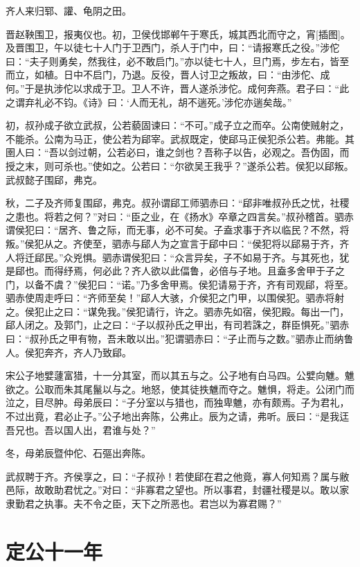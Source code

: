 \documentclass[a4paper,12pt,UTF8,twoside]{ctexbook}
\begin{document}
齐人来归郓、讙、龟阴之田。

晋赵鞅围卫，报夷仪也。初，卫侯伐邯郸午于寒氏，城其西北而守之，宵[插图]。及晋围卫，午以徒七十人门于卫西门，杀人于门中，曰：“请报寒氏之役。”涉佗曰：“夫子则勇矣，然我往，必不敢启门。”亦以徒七十人，旦门焉，步左右，皆至而立，如植。日中不启门，乃退。反役，晋人讨卫之叛故，曰：“由涉佗、成何。”于是执涉佗以求成于卫。卫人不许，晋人遂杀涉佗。成何奔燕。君子曰：“此之谓弃礼必不钧。《诗》曰：‘人而无礼，胡不遄死。’涉佗亦遄矣哉。”

初，叔孙成子欲立武叔，公若藐固谏曰：“不可。”成子立之而卒。公南使贼射之，不能杀。公南为马正，使公若为郈宰。武叔既定，使郈马正侯犯杀公若。弗能。其圉人曰：“吾以剑过朝，公若必曰，谁之剑也？吾称子以告，必观之。吾伪固，而授之末，则可杀也。”使如之。公若曰：“尔欲吴王我乎？”遂杀公若。侯犯以郈叛。武叔懿子围郈，弗克。

秋，二子及齐师复围郈，弗克。叔孙谓郈工师驷赤曰：“郈非唯叔孙氏之忧，社稷之患也。将若之何？”对曰：“臣之业，在《扬水》卒章之四言矣。”叔孙稽首。驷赤谓侯犯曰：“居齐、鲁之际，而无事，必不可矣。子盍求事于齐以临民？不然，将叛。”侯犯从之。齐使至，驷赤与郈人为之宣言于郈中曰：“侯犯将以郈易于齐，齐人将迁郈民。”众兇惧。驷赤谓侯犯曰：“众言异矣，子不如易于齐。与其死也，犹是郈也。而得纾焉，何必此？齐人欲以此偪鲁，必倍与子地。且盍多舍甲于子之门，以备不虞？”侯犯曰：“诺。”乃多舍甲焉。侯犯请易于齐，齐有司观郈，将至。驷赤使周走呼曰：“齐师至矣！”郈人大骇，介侯犯之门甲，以围侯犯。驷赤将射之。侯犯止之曰：“谋免我。”侯犯请行，许之。驷赤先如宿，侯犯殿。每出一门，郈人闭之。及郭门，止之曰：“子以叔孙氏之甲出，有司若誅之，群臣惧死。”驷赤曰：“叔孙氏之甲有物，吾未敢以出。”犯谓驷赤曰：“子止而与之数。”驷赤止而纳鲁人。侯犯奔齐，齐人乃致郈。

宋公子地嬖蘧富猎，十一分其室，而以其五与之。公子地有白马四。公嬖向魋。魋欲之。公取而朱其尾鬣以与之。地怒，使其徒抶魋而夺之。魋惧，将走。公闭门而泣之，目尽肿。母弟辰曰：“子分室以与猎也，而独卑魋，亦有颇焉。子为君礼，不过出竟，君必止子。”公子地出奔陈，公弗止。辰为之请，弗听。辰曰：“是我迋吾兄也。吾以国人出，君谁与处？”

冬，母弟辰暨仲佗、石彄出奔陈。

武叔聘于齐。齐侯享之，曰：“子叔孙！若使郈在君之他竟，寡人何知焉？属与敝邑际，故敢助君忧之。”对曰：“非寡君之望也。所以事君，封疆社稷是以。敢以家隶勤君之执事。夫不令之臣，天下之所恶也。君岂以为寡君赐？”

\chapter{定公十一年}
\end{document}
